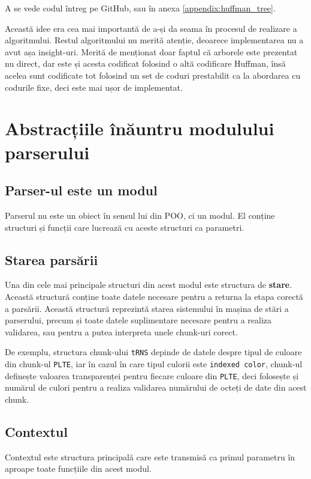 \documentclass[a4paper,12pt]{report}
\begin{document}
A se vede codul întreg pe GitHub, sau în anexa \ref{appendix:huffman_tree}.

Această idee era cea mai importantă de a-și da seama în procesul de realizare a algoritmului.
Restul algoritmului nu merită atenție, deoarece implementarea nu a avut așa insight-uri.
Merită de menționat doar faptul că arborele este prezentat nu direct,
dar este și acesta codificat folosind o altă codificare Huffman,
însă acelea sunt codificate tot folosind un set de coduri prestabilit
ca la abordarea cu codurile fixe, deci este mai ușor de implementat.

\section{Abstracțiile înăuntru modulului parserului}

\subsection{Parser-ul este un modul}

Parserul nu este un obiect în sensul lui din \ac{POO}, ci un modul.
El conține structuri și funcții care lucrează cu aceste structuri ca parametri.

\subsection{Starea parsării}

Una din cele mai principale structuri din acest modul este structura de \textbf{stare}.
Această structură conține toate datele necesare pentru a returna la etapa corectă a parsării.
Această structură reprezintă starea sistemului în mașina de stări a parserului,
precum și toate datele suplimentare necesare pentru a realiza validarea,
sau pentru a putea interpreta unele chunk-uri corect.

De exemplu, structura chunk-ului \texttt{tRNS} depinde de datele despre
tipul de culoare din chunk-ul \texttt{PLTE}, iar în cazul în care tipul culorii este \texttt{indexed color},
chunk-ul definește valoarea transparenței pentru fiecare culoare din \texttt{PLTE},
deci folosește și numărul de culori pentru a realiza validarea numărului de octeți de date din acest chunk.

\subsection{Contextul}

Contextul este structura principală care este transmisă ca primul parametru
în aproape toate funcțiile din acest modul.
\end{document}
